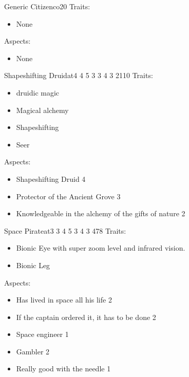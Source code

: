 \documentclass[11pt]{article}
\begin{document}
{\begin{npc}{Generic Citizen}{co}{2}{0}
Traits:
\begin{itemize}
\item None
\end{itemize}

\columnbreak

Aspects:
\begin{itemize}
\item None
\end{itemize}
\end{npc}

\begin{npc}{Shapeshifting Druid}{at}{4 4 5 3 3 4 3 2}{110}
Traits:
\begin{itemize}
\item druidic magic
\item Magical alchemy
\item Shapeshifting
\item Seer
\end{itemize}

\columnbreak

Aspects:
\begin{itemize}
\item Shapeshifting Druid 4
\item Protector of the Ancient Grove 3
\item Knowledgeable in the alchemy of the gifts of nature 2
\end{itemize}
\end{npc}

\begin{npc}{Space Pirate}{at}{3 3 4 5 3 4 3 4}{78}
Traits:
\begin{itemize}
\item Bionic Eye with super zoom level and infrared vision.
\item Bionic Leg
\end{itemize}

\columnbreak

Aspects:
\begin{itemize}
\item Has lived in space all his life 2
\item If the captain ordered it, it has to be done 2
\item Space engineer 1
\item Gambler 2
\item Really good with the needle 1
\end{itemize}
\end{npc}


}
\end{document}
